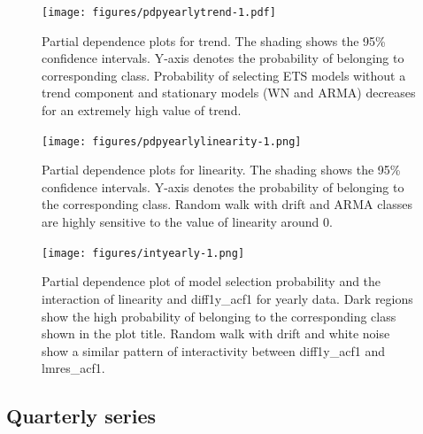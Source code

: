\documentclass[11pt,a4paper,]{article}
\begin{document}
\begin{figure}
\centering
\texttt{[image: figures/pdpyearlytrend-1.pdf]}
\caption{\label{fig:pdpyearlytrend}Partial dependence plots for trend. The shading shows the 95\% confidence intervals. Y-axis denotes the probability of belonging to corresponding class. Probability of selecting ETS models without a trend component and stationary models (WN and ARMA) decreases for an extremely high value of trend.}
\end{figure}

\begin{figure}
\centering
\texttt{[image: figures/pdpyearlylinearity-1.png]}
\caption{\label{fig:pdpyearlylinearity}Partial dependence plots for linearity. The shading shows the 95\% confidence intervals. Y-axis denotes the probability of belonging to the corresponding class. Random walk with drift and ARMA classes are highly sensitive to the value of linearity around 0.}
\end{figure}

\begin{figure}
\centering
\texttt{[image: figures/intyearly-1.png]}
\caption{\label{fig:intyearly}Partial dependence plot of model selection probability and the interaction of linearity and diff1y\_acf1 for yearly data. Dark regions show the high probability of belonging to the corresponding class shown in the plot title. Random walk with drift and white noise show a similar pattern of interactivity between diff1y\_acf1 and lmres\_acf1.}
\end{figure}

\hypertarget{quarterly-series}{%
\subsection{Quarterly series}\label{quarterly-series}}
\end{document}

